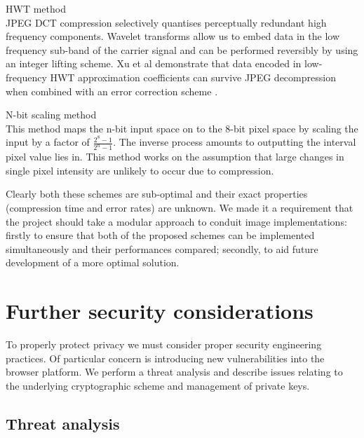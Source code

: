 \begin{sdesc}

    \item[HWT method] \hfill \\ JPEG DCT compression selectively quantises perceptually redundant high frequency components. Wavelet transforms allow us to embed data in the low frequency sub-band of the carrier signal and can be performed reversibly by using an integer lifting scheme. Xu et al demonstrate that data encoded in low-frequency HWT approximation coefficients can survive JPEG decompression when combined with an error correction scheme \cite{haar}.
    
    \item[N-bit scaling method] \hfill \\ This method maps the n-bit input space on to the 8-bit pixel space by scaling the input by a factor of $ \frac{2^8 - 1}{2^n - 1}$. The inverse process amounts to outputting the interval pixel value lies in. This method works on the assumption that large changes in single pixel intensity are unlikely to occur due to compression.

\end{sdesc}

Clearly both these schemes are sub-optimal and their exact properties (compression time and error rates) are unknown. We made it a requirement that the project should take a modular approach to conduit image implementations: firstly to ensure that both of the proposed schemes can be implemented simultaneously and their performances compared; secondly, to aid future development of a more optimal solution.



\FloatBarrier 
\section{Further security considerations}
\label{sec:security}

To properly
protect privacy we must consider proper security engineering practices. Of particular concern is introducing new vulnerabilities into the browser platform. We perform a threat analysis and describe issues relating to the underlying cryptographic scheme and management of private keys.

\FloatBarrier
\subsection{Threat analysis}
\label{ssec:threat}

